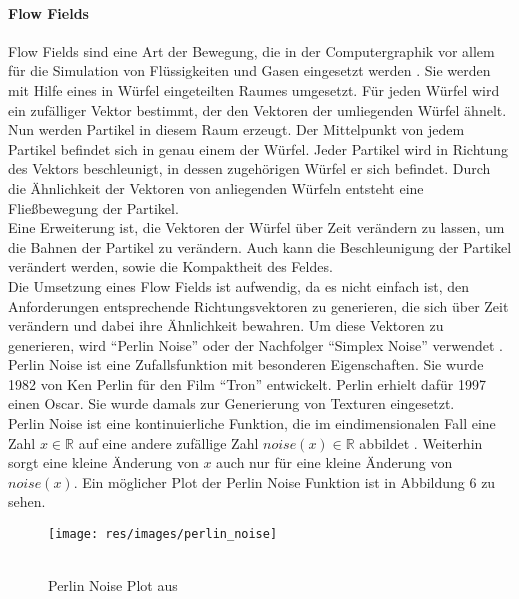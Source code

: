 \documentclass[11pt,a4paper]{article}
\begin{document}
\paragraph{Flow Fields} Flow Fields sind eine Art der Bewegung, die in der Computergraphik vor allem für die Simulation von Flüssigkeiten und Gasen eingesetzt werden \cite{stam1999stable}. Sie werden mit Hilfe eines in Würfel eingeteilten Raumes umgesetzt. Für jeden Würfel wird ein zufälliger Vektor bestimmt, der den Vektoren der umliegenden Würfel ähnelt. Nun werden Partikel in diesem Raum erzeugt. Der Mittelpunkt von jedem Partikel befindet sich in genau einem der Würfel. Jeder Partikel wird in Richtung des Vektors beschleunigt, in dessen zugehörigen Würfel er sich befindet. Durch die Ähnlichkeit der Vektoren von anliegenden Würfeln entsteht eine Fließbewegung der Partikel.\\
Eine Erweiterung ist, die Vektoren der Würfel über Zeit verändern zu lassen, um die Bahnen der Partikel zu verändern. Auch kann die Beschleunigung der Partikel verändert werden, sowie die Kompaktheit des Feldes.\\
Die Umsetzung eines Flow Fields ist aufwendig, da es nicht einfach ist, den Anforderungen entsprechende Richtungsvektoren zu generieren, die sich über Zeit verändern und dabei ihre Ähnlichkeit bewahren. Um diese Vektoren zu generieren, wird ``Perlin Noise'' oder der Nachfolger ``Simplex Noise'' verwendet \cite{bcc7190da8e90284b4e790817b8eed4ee3ea6cffbe5a23ef07a000ca5628ffbc}. Perlin Noise ist eine Zufallsfunktion mit besonderen Eigenschaften. Sie wurde 1982 von Ken Perlin für den Film ``Tron'' entwickelt. Perlin erhielt dafür 1997 einen Oscar. Sie wurde damals zur Generierung von Texturen eingesetzt.\\
Perlin Noise ist eine kontinuierliche Funktion, die im  eindimensionalen Fall eine Zahl $x \in \mathbb{R}$ auf eine andere zufällige Zahl $noise(x) \in \mathbb{R}$ abbildet \cite{25a05da283ffd9d4bdda94c308ccf3a8759f22373b368f895cbef2e9186ab646}. Weiterhin sorgt eine kleine Änderung von $x$ auch nur für eine kleine Änderung von $noise(x)$. Ein möglicher Plot der Perlin Noise Funktion ist in Abbildung 6 zu sehen.
\begin{SCfigure}[][h]
\hspace{110pt}
\texttt{[image: res/images/perlin\_noise]}
\caption[Perlin Noise Plot aus \cite{nature_of_code}]{\\Perlin Noise Plot aus \cite[Kap.\\Introduction]{nature_of_code}}
\end{SCfigure}
\end{document}
